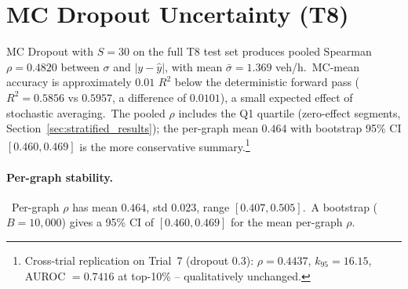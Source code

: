 \begin{table}[htbp]
\centering
\caption[Compact comparison: T1, T8, Deep Ensemble]{Compact comparison of T1, T8 and the Deep Ensemble.\ T1 has the highest absolute $R^2$ but is not MC-Dropout-compatible; T8 is the primary UQ base; the Deep Ensemble has the highest $R^2$ among the UQ-compatible models.\ T1 was evaluated on a separate 50-graph test set under an 80/15/5 split, whereas T8 and the Deep Ensemble share a different 100-graph test set under the 80/10/10 split (not a subsampled version of the same set), so the two test sets are independent and the cross-group comparison should be read descriptively.}
\label{tab:t1_t8_de_compact}
\end{table}

\section{MC Dropout Uncertainty (T8)}\label{sec:mc_results}

MC Dropout with $S = 30$ on the full T8 test set produces pooled Spearman $\rho = 0.4820$ between $\sigma$ and $|y - \hat y|$, with mean $\bar\sigma = 1.369$ veh/h.\ MC-mean accuracy is approximately $0.01$ $R^2$ below the deterministic forward pass ($R^2 = 0.5856$ vs $0.5957$, a difference of $0.0101$), a small expected effect of stochastic averaging.\ The pooled $\rho$ includes the Q1 quartile (zero-effect segments, Section~\ref{sec:stratified_results}); the per-graph mean $0.464$ with bootstrap 95\% CI $[0.460, 0.469]$ is the more conservative summary.\footnote{Cross-trial replication on Trial~7 (dropout 0.3): $\rho = 0.4437$, $k_{95} = 16.15$, AUROC $= 0.7416$ at top-10\% -- qualitatively unchanged.}

\paragraph{Per-graph stability.}\ Per-graph $\rho$ has mean $0.464$, std $0.023$, range $[0.407, 0.505]$.\ A bootstrap ($B = 10{,}000$) gives a 95\% CI of $[0.460, 0.469]$ for the mean per-graph $\rho$.

